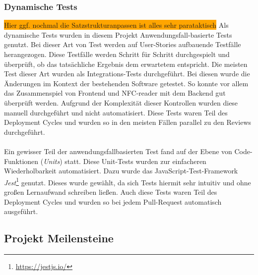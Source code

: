\documentclass[10pt, a4paper]{article}
\begin{document}
\subsubsection*{Dynamische Tests}
\colorbox{orange}{Hier ggf. nochmal die Satzstrukturanpassen ist alles sehr parataktisch}
Als dynamische Tests wurden in diesem Projekt Anwendungsfall-basierte Tests genutzt.
Bei dieser Art von Test werden auf User-Stories aufbauende Testfälle herangezogen.
Diese Testfälle werden Schritt für Schritt \glqq durchgespielt\grqq{} und überprüft, ob das tatsächliche Ergebnis dem erwartetem entspricht.
Die meisten Test  dieser Art wurden als Integrations-Tests durchgeführt.
Bei diesen wurde die Änderungen im Kontext der bestehenden Software getestet.
So konnte vor allem das Zusammenspiel von Frontend und NFC-reader mit dem Backend gut überprüft werden.
Aufgrund der Komplexität dieser Kontrollen wurden diese manuell durchgeführt und nicht automatisiert.
Diese Tests waren Teil des Deployment Cycles und wurden so in den meisten Fällen parallel zu den Reviews durchgeführt.
\\~\\
Ein gewisser Teil der anwendungsfallbasierten Test fand auf der Ebene von Code-Funktionen (\textit{Units}) statt.
Diese Unit-Tests wurden zur einfacheren Wiederholbarkeit automatisiert.
Dazu wurde das JavaScript-Test-Framework \textit{Jest}\footnote{\raggedright\url{https://jestjs.io/}} genutzt.
Dieses wurde gewählt, da sich Tests hiermit sehr intuitiv und ohne großen Lernaufwand schreiben ließen.
Auch diese Tests waren Teil des Deployment Cycles und wurden so bei jedem Pull-Request automatisch ausgeführt.


\subsection{Projekt Meilensteine}
\end{document}
